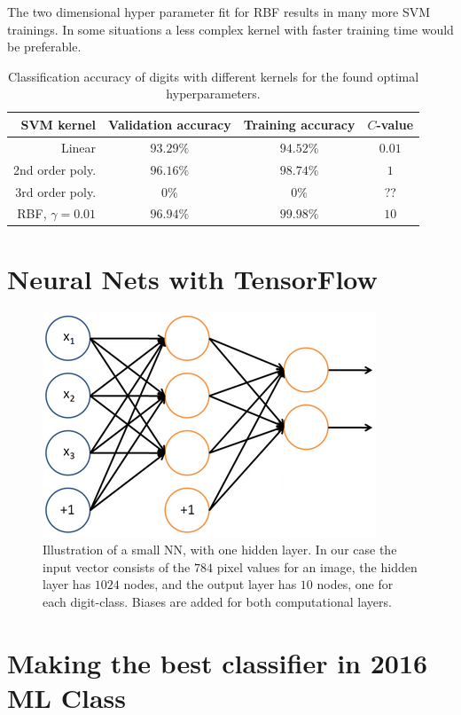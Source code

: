 \documentclass[a4paper,10pt,article,oneside,english]{memoir}
\begin{document}
The two dimensional hyper parameter fit for RBF results in many more SVM trainings. In some situations a less complex kernel with faster training time would be preferable.

\begin{table}[h!]
	\centering
	\caption{Classification accuracy of digits with different kernels for the found optimal hyperparameters. }
	\label{tab:svm_accuracy}
	\begin{tabular}{rccc}
		SVM kernel & Validation accuracy & Training accuracy & $C$-value \\ 
		\hline 
		Linear & $93.29\%$ & $94.52\%$ & $0.01$ \\ 
		2nd order poly. & $96.16\%$ & $98.74\%$ & $1$ \\ 
		3rd order poly. & $0\%$ & $0\%$ & ?? \\ 
		RBF, $\gamma=0.01$ & $96.94\%$ & $99.98\%$ & $10$ \\ 
	\end{tabular} 
\end{table}










\chapter{Neural Nets with TensorFlow}

\begin{figure}[h!]
	\centering
	\includegraphics[width=0.4\linewidth]{nn_layout.png}
	\caption{Illustration of a small NN, with one hidden layer. In our case the input vector consists of the $784$ pixel values for an image, the hidden layer has $1024$ nodes, and the output layer has $10$ nodes, one for each digit-class. Biases are added for both computational layers.}
	\label{fig:nn_layout}
\end{figure}


\chapter{Making the best classifier in 2016 ML Class}



	
\end{document}
